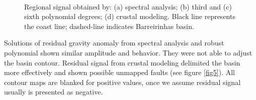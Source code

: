 \documentclass{sciposter}
\begin{document}
\begin{multicols}{3}
	\begin{figure}[ht!]
	\begin{center}
	\\
	\end{center}
	\caption{Regional signal obtained by: (a) spectral analysis; (b) third and (c) sixth polynomial degrees; (d) crustal modeling. Black line represents the coast line; dashed-line indicates Barreirinhas basin.}
	\label{fig4}
	\end{figure}
	
	Solutions of residual gravity anomaly from spectral analysis and robust polynomial shown similar amplitude and behavior. They were not able to adjust the basin contour. Residual signal from crustal modeling delimited the basin more effectively and shown possible unmapped faults (see figure \ref{fig5}). 
	All contour maps are blanked for positive values, once we assume residual signal usually is presented as negative.


\end{multicols}
\end{document}
